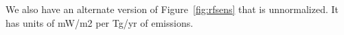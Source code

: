 We also have an alternate version of Figure~\ref{fig:rfsens} that is unnormalized. It has units of mW/m2 per Tg/yr of emissions.